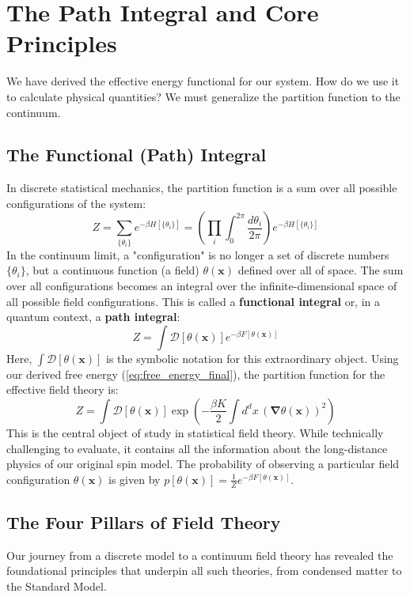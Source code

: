 \documentclass[11pt, a4paper, article]{article}
\renewcommand{\vec}[1]{\bm{#1}} %
\newcommand{\funcint}[1]{\mathcal{D}[#1]} %
\begin{document}
\newpage
\section{The Path Integral and Core Principles}
We have derived the effective energy functional for our system. How do we use it to calculate physical quantities? We must generalize the partition function to the continuum.

\subsection{The Functional (Path) Integral}
In discrete statistical mechanics, the partition function is a sum over all possible configurations of the system:
\begin{equation}
    Z = \sum_{\{\theta_i\}} e^{-\beta H[\{\theta_i\}]} = \left( \prod_i \int_0^{2\pi} \frac{d\theta_i}{2\pi} \right) e^{-\beta H[\{\theta_i\}]}
\end{equation}
In the continuum limit, a "configuration" is no longer a set of discrete numbers $\{\theta_i\}$, but a continuous function (a field) $\theta(\vec{x})$ defined over all of space. The sum over all configurations becomes an integral over the infinite-dimensional space of all possible field configurations. This is called a \textbf{functional integral} or, in a quantum context, a \textbf{path integral}:
\begin{equation}
    Z = \int \funcint{\theta(\vec{x})} e^{-\beta F[\theta(\vec{x})]}
\end{equation}
Here, $\int \funcint{\theta(\vec{x})}$ is the symbolic notation for this extraordinary object. Using our derived free energy (\ref{eq:free_energy_final}), the partition function for the effective field theory is:
\begin{equation}
    Z = \int \funcint{\theta(\vec{x})} \exp\left( -\frac{\beta K}{2} \int d^d x \, (\vec{\nabla}\theta(\vec{x}))^2 \right)
\end{equation}
This is the central object of study in statistical field theory. While technically challenging to evaluate, it contains all the information about the long-distance physics of our original spin model. The probability of observing a particular field configuration $\theta(\vec{x})$ is given by $p[\theta(\vec{x})] = \frac{1}{Z} e^{-\beta F[\theta(\vec{x})]}$.

\subsection{The Four Pillars of Field Theory}
Our journey from a discrete model to a continuum field theory has revealed the foundational principles that underpin all such theories, from condensed matter to the Standard Model.
\end{document}
